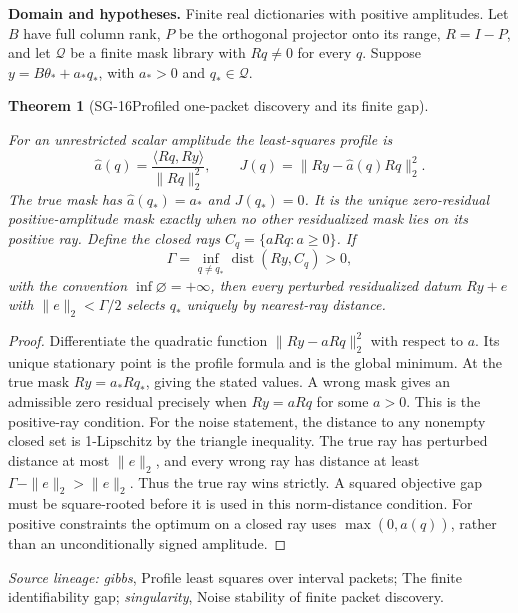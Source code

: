 \documentclass[11pt]{article}
\newtheorem{theorem}{Theorem}[section]
\theoremstyle{definition}\newtheorem{definition}[theorem]{Definition}
\theoremstyle{remark}\newtheorem{remark}[theorem]{Remark}
\begin{document}
\par{\small\textbf{Domain and hypotheses.} Finite real dictionaries with positive amplitudes. Let $B$ have full column rank, $P$ be the orthogonal projector onto its range, $R=I-P$, and let $\mathcal Q$ be a finite mask library with $Rq\ne0$ for every $q$. Suppose $y=B\theta_*+a_*q_*$, with $a_*>0$ and $q_*\in\mathcal Q$.}\par
\begin{theorem}[SG-16\quad Profiled one-packet discovery and its finite gap]\label{SG-16}

For an unrestricted scalar amplitude the least-squares profile is
\[
 \widehat a(q)=\frac{\langle Rq,Ry\rangle}{\|Rq\|_2^2},
 \qquad J(q)=\|Ry-\widehat a(q)Rq\|_2^2.
\]
The true mask has $\widehat a(q_*)=a_*$ and $J(q_*)=0$.
It is the unique zero-residual positive-amplitude mask exactly when no other
residualized mask lies on its positive ray. Define the closed rays
$C_q=\{aRq:a\ge0\}$. If
\[
 \Gamma=\inf_{q\ne q_*}\operatorname{dist}(Ry,C_q)>0,
\]
with the convention $\inf\varnothing=+\infty$, then every perturbed residualized datum $Ry+e$ with $\|e\|_2<\Gamma/2$
selects $q_*$ uniquely by nearest-ray distance.

\end{theorem}
\begin{proof}

Differentiate the quadratic function $\|Ry-aRq\|_2^2$ with respect to $a$.
Its unique stationary point is the profile formula and is the global
minimum. At the true mask $Ry=a_*Rq_*$, giving the stated values.
A wrong mask gives an admissible zero residual precisely when
$Ry=aRq$ for some $a>0$. This is the positive-ray condition.
For the noise statement, the distance to any nonempty closed set is
1-Lipschitz by the triangle inequality. The true ray has perturbed distance
at most $\|e\|_2$, and every wrong ray has distance at least
$\Gamma-\|e\|_2>\|e\|_2$. Thus the true ray wins strictly.
A squared objective gap must be square-rooted before it is used in this
norm-distance condition. For positive constraints the optimum on a closed
ray uses $\max(0,\widehat a(q))$, rather than an unconditionally signed
amplitude.

\end{proof}

\par{\small\color{Teal}\textit{Source lineage:} \textit{gibbs}, Profile least squares over interval packets; The finite identifiability gap; \textit{singularity}, Noise stability of finite packet discovery.}\par
\end{document}
